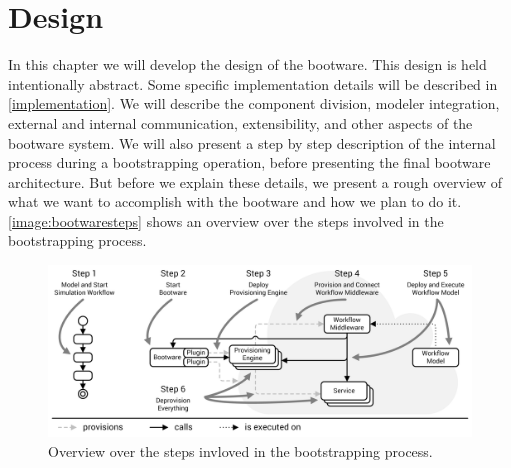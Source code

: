 \chapter{Design}
\label{design}

In this chapter we will develop the design of the bootware.
This design is held intentionally abstract.
Some specific implementation details will be described in \autoref{implementation}.
We will describe the component division, modeler integration, external and internal communication, extensibility, and other aspects of the bootware system.
We will also present a step by step description of the internal process during a bootstrapping operation, before presenting the final bootware architecture.
But before we explain these details, we present a rough overview of what we want to accomplish with the bootware and how we plan to do it.
\autoref{image:bootwaresteps} shows an overview over the steps involved in the bootstrapping process.

\begin{figure}[!htbp]
	\centering
	\includegraphics[resolution=600]{design/assets/bootware_steps}
	\caption{Overview over the steps invloved in the bootstrapping process.}
	\label{image:bootwaresteps}
\end{figure}

